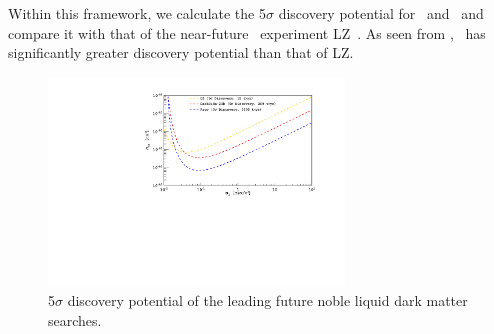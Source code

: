Within this framework, we calculate the 5$\sigma$ discovery potential for \DSks\ and \Argo\ and compare it with that of the near-future \LXe\ experiment LZ~\cite{Dobson:2018us}.  As seen from , \DSks\ has significantly greater discovery potential than that of LZ.




\begin{figure}
\begin{center}
\includegraphics[width=0.7\textwidth]{./Figures/NobleDiscoveryComp.pdf}
\caption{5$\sigma$ discovery potential of the leading future noble liquid dark matter searches.  %
}
\label{fig:NobleDiscoveryComp}
\end{center}
\end{figure}




